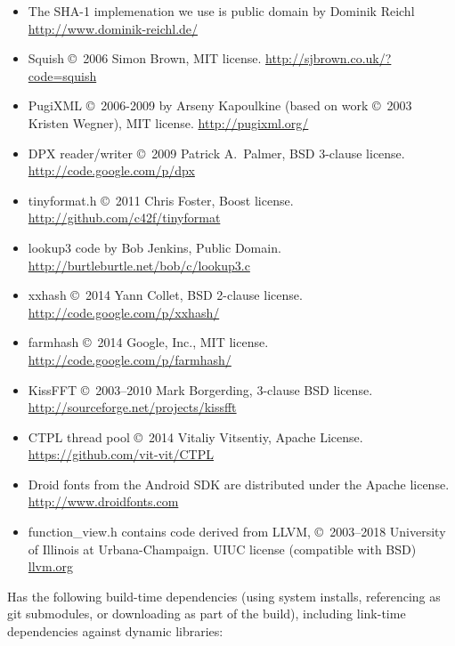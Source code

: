 \begin{itemize}
\item The SHA-1 implemenation we use is public domain by
Dominik Reichl \\ \url{http://www.dominik-reichl.de/}
\item Squish \copyright\ 2006 Simon Brown, MIT license.
\url{http://sjbrown.co.uk/?code=squish}
\item PugiXML \copyright\ 2006-2009 by Arseny Kapoulkine (based on work
\copyright\ 2003 Kristen Wegner), MIT license. \url{http://pugixml.org/}
\item DPX reader/writer \copyright\ 2009 Patrick A.\ Palmer, BSD 3-clause license.
  \\ \url{http://code.google.com/p/dpx}
\item {\cf tinyformat.h} \copyright\ 2011 Chris Foster, Boost license. \\
  \url{http://github.com/c42f/tinyformat}
\item {\cf lookup3} code by Bob Jenkins, Public Domain. \\
\url{http://burtleburtle.net/bob/c/lookup3.c}
\item {\cf xxhash} \copyright\ 2014 Yann Collet, BSD 2-clause license. \\
\url{http://code.google.com/p/xxhash/}
\item {\cf farmhash} \copyright\ 2014 Google, Inc., MIT license.
\url{http://code.google.com/p/farmhash/}
\item {\cf KissFFT} \copyright\ 2003--2010 Mark Borgerding, 3-clause BSD license.
  \\ \url{http://sourceforge.net/projects/kissfft}
\item {\cf CTPL} thread pool \copyright\ 2014 Vitaliy Vitsentiy, Apache License.
  \\ \url{https://github.com/vit-vit/CTPL}
\item Droid fonts from the Android SDK are distributed under the
    Apache license. \\ \url{http://www.droidfonts.com}
\item {\cf function_view.h} contains code derived from LLVM,
  \copyright\ 2003--2018 University of Illinois at Urbana-Champaign.
  UIUC license (compatible with BSD) \\ \url{llvm.org}
\end{itemize}

\noindent \product Has the following build-time dependencies (using
system installs, referencing as git submodules, or downloading as part of
the build), including link-time dependencies
against dynamic libraries:

